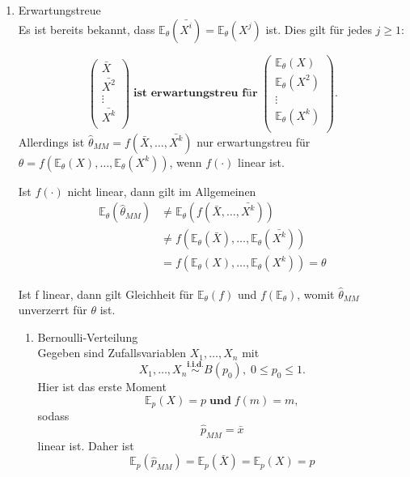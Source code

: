\documentclass[10pt]{article}
\newcommand{\FZV}{X_1, \ldots, X_n} %
\newcommand{\EW}{\mathbb{E}} %
\newenvironment{BSP}[1][]
{\begin{Beispiel}[frametitle=#1]}{\end{Beispiel}}
\begin{document}
\begin{enumerate}
	\item Erwartungstreue\\
	Es ist bereits bekannt, dass $\EW_\theta(\bar{X^i})=\EW_\theta(X^j)$ ist. Dies gilt für jedes $j \geq 1$:
	
	\begin{equation*}
		\left(
		\begin{array}{c}
			\bar{X}\\
			\bar{X^2}\\
			\vdots\\
			\bar{X^k}\\
		\end{array}
		\right)\; \textbf{ist erwartungstreu für} \;
		\left(
		\begin{array}{c}
		 \EW_\theta(X)\\
		 \EW_\theta(X^2)\\
			\vdots\\
		 \EW_\theta(X^k) \\
		\end{array}
		\right).
	\end{equation*}
	 Allerdings ist $\hat{\theta}_{MM} = f(\bar{X}, \ldots, \bar{X^k})$ nur erwartungstreu für $\theta = f(\EW_\theta(X), \ldots, \EW_\theta(X^k))$, wenn $f(\cdot)$ linear ist. 
	 
	 Ist $f(\cdot)$ nicht linear, dann gilt im Allgemeinen
	 \begin{equation*}
	 	\begin{split}
	 	\EW_\theta(\hat{\theta}_{MM}) &\neq \EW_\theta(f(\bar{X}, \ldots, \bar{X^k}))\\
	 	&\neq f(\EW_\theta(\bar{X}),\ldots, \EW_\theta(\bar{X^k}))\\
	 	&= f(\EW_\theta({X}),\ldots, \EW_\theta({X^k})) =  \theta
	 \end{split}
	 \end{equation*}
	
	Ist f linear, dann gilt Gleichheit für $\EW_{\theta}(f)$ und $f(\EW_{\theta})$, womit $\hat{\theta}_{MM}$ unverzerrt für $\theta$ ist.\\
	
	\begin{BSP}[Beispiel 1.3.3 (Erwartungstreue)]
			\begin{enumerate}[label = (\roman*)]
			\item Bernoulli-Verteilung\\
			Gegeben sind Zufallsvariablen $\FZV$ mit
			\begin{equation*}
				\FZV \overset{\textbf{i.i.d.}}{\sim} B(p_0), \; 0 \leq p_0 \leq 1.
			\end{equation*} 
			Hier ist das erste Moment
			\begin{equation*}
				\EW_p(X)=p \; \textbf{und} \; 	f(m)=m,
			\end{equation*}
			sodass
			\begin{equation*}
				\hat{p}_{MM} = \bar{x} 
			\end{equation*}
			linear ist. Daher ist 
			\begin{equation*}
				\EW_p(\hat{p}_{MM}) = \EW_p(\bar{X}) = \EW_p(X) = p
			\end{equation*}
			

\end{enumerate}
\end{BSP}
\end{enumerate}
\end{document}
